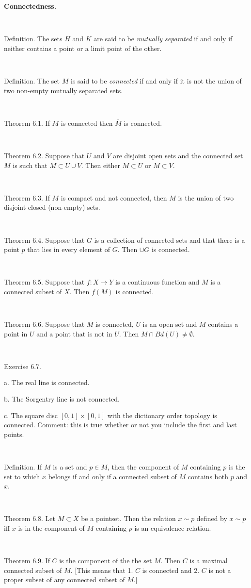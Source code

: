 \documentclass[12pt, std]{article}
\begin{document}
\begin{center} \textbf{Connectedness.} \end{center}

\

Definition.  The sets $H$ and $K$ are said to be \textit{mutually
separated} if and only if neither contains a point or a limit point
of the other.

\

Definition.  The set $M$ is said to be \textit{connected} if and
only if it is not the union of two non-empty mutually separated
sets.

\

Theorem 6.1.  If $M$ is connected then $\overline{M}$ is connected.

\

Theorem 6.2.  Suppose that $U$ and $V$ are disjoint open sets and
the connected set $M$ is such that $M\subset U \cup V$.  Then either
$M \subset U$ or $M \subset V$.

\

Theorem 6.3.  If $M$ is compact and not connected, then $M$ is the
union of two disjoint closed (non-empty) sets.

\

Theorem 6.4.  Suppose that $G$ is a collection of connected sets and
that there is a point $p$ that lies in every element of $G$.  Then
$\cup G$ is connected.

\

Theorem 6.5.  Suppose that $f: X \rightarrow Y$ is a continuous
function and $M$ is a connected subset of $X$.  Then $f(M)$ is
connected.

\

Theorem 6.6.  Suppose that $M$ is connected, $U$ is an open set and
$M$ contains a point in $U$ and a point that is not in $U$.  Then $M
\cap Bd(U) \ne \emptyset$.

\

Exercise 6.7.  

\qquad a. The real line is connected.

\qquad b. The Sorgentry line is not connected.

\qquad c. The square disc $[0,1] \times [0,1]$ with the dictionary order topology is connected.  Comment: this is true whether or not you include the first and last points.

\

Definition.  If $M$ is a set and $p\in M$, then the component of $M$
containing $p$ is the set to which $x$ belongs if and only if a
connected subset of $M$ contains both $p$ and $x$.

\

Theorem 6.8.  Let $M \subset X$ be a pointset.  Then the relation $x
\sim p$ defined by $x \sim p$ iff $x$ is in the component of $M$
containing $p$ is an equivalence relation.

\

Theorem 6.9. If $C$ is the component of the the set $M$. Then $C$ is
a maximal connected subset of $M$.  [This means that 1. $C$ is
connected and 2. $C$ is not a proper subset of any connected subset
of $M$.]
\end{document}
